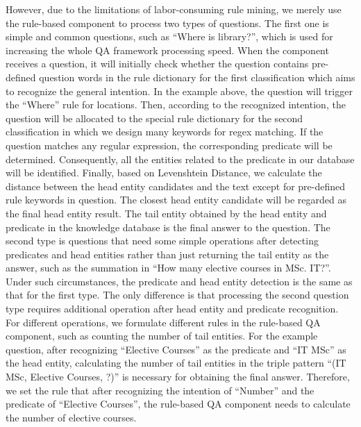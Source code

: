 \documentclass[11pt]{article}
\begin{document}
However, due to the limitations of labor-consuming rule mining, we merely use the rule-based component to process two types of questions. The first one is simple and common questions, such as ``Where is library?'', which is used for increasing the whole QA framework processing speed. When the component receives a question, it will initially check whether the question contains pre-defined question words in the rule dictionary for the first classification which aims to recognize the general intention. In the example above, the question will trigger the ``Where'' rule for locations. Then, according to the recognized intention, the question will be allocated to the special rule dictionary for the second classification in which we design many keywords for regex matching. If the question matches any regular expression, the corresponding predicate will be determined. Consequently, all the entities related to the predicate in our database will be identified. Finally, based on Levenshtein Distance, we calculate the distance between the head entity candidates and the text except for pre-defined rule keywords in question. The closest head entity candidate will be regarded as the final head entity result. The tail entity obtained by the head entity and predicate in the knowledge database is the final answer to the question. The second type is questions that need some simple operations after detecting predicates and head entities rather than just returning the tail entity as the answer, such as the summation in ``How many elective courses in MSc. IT?''. Under such circumstances, the predicate and head entity detection is the same as that for the first type. The only difference is that processing the second question type requires additional operation after head entity and predicate recognition. For different operations, we formulate different rules in the rule-based QA component, such as counting the number of tail entities. For the example question, after recognizing ``Elective Courses'' as the predicate and ``IT MSc'' as the head entity, calculating the number of tail entities in the triple pattern ``(IT MSc, Elective Courses, ?)'' is necessary for obtaining the final answer. Therefore, we set the rule that after recognizing the intention of ``Number'' and the predicate of ``Elective Courses'', the rule-based QA component needs to calculate the number of elective courses.
\end{document}
